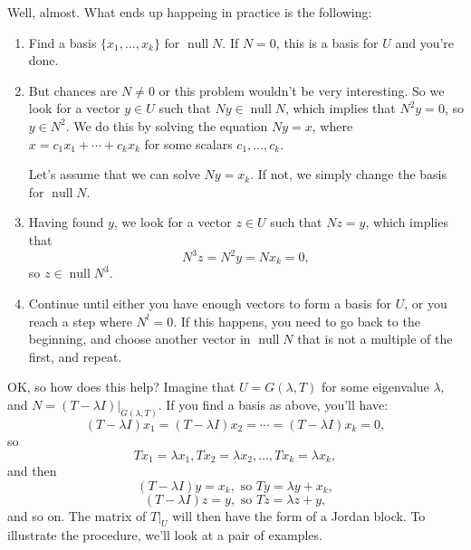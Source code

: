 \documentclass[12pt,letterpaper]{article}
\theoremstyle{definition}
\DeclareMathOperator{\nul}{null}
\begin{document}
Well, almost. What ends up happeing in practice is the following:
\begin{enumerate}
 \item Find a basis $\{x_1,\ldots, x_k\}$ for $\nul N$. If $N=0$, this is a basis for $U$ and you're done.
 \item But chances are $N\neq 0$ or this problem wouldn't be very interesting. So we look for a vector $y\in U$ such that $Ny\in \nul N$, which implies that $N^2y=0$, so $y\in N^2$. We do this by solving the equation $Ny=x$, where $x=c_1x_1+\cdots +c_kx_k$ for some scalars $c_1,\ldots, c_k$.

 Let's assume that we can solve $Ny=x_k$. If not, we simply change the basis for $\nul N$.
 \item Having found $y$, we look for a vector $z\in U$ such that $Nz=y$, which implies that
\[
 N^3z = N^2y = Nx_k = 0,
\]
so $z\in \nul N^3$.
 \item Continue until either you have enough vectors to form a basis for $U$, or you reach a step where $N^l=0$. If this happens, you need to go back to the beginning, and choose another vector in $\nul N$ that is not a multiple of the first, and repeat.
\end{enumerate}
OK, so how does this help? Imagine that $U=G(\lambda ,T)$ for some eigenvalue $\lambda$, and $N = (T-\lambda I)|_{G(\lambda,T)}$. If you find a basis as above, you'll have:
\[
 (T-\lambda I)x_1 = (T-\lambda I)x_2=\cdots = (T-\lambda I)x_k = 0,
\]
so 
\[
 Tx_1=\lambda x_1, Tx_2=\lambda x_2, \ldots, Tx_k=\lambda x_k,
\]
and then
\[
 (T-\lambda I)y = x_k, \text{ so } Ty = \lambda y + x_k,
\]
\[
 (T-\lambda I)z = y, \text{ so } Tz = \lambda z+y,
\]
and so on. The matrix of $T|_U$ will then have the form of a Jordan block. To illustrate the procedure, we'll look at a pair of examples.
\end{document}
